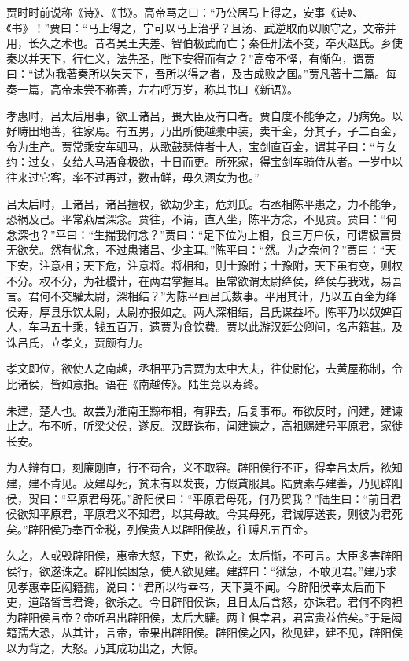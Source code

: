 \documentclass[]{article}
\begin{document}
贾时时前说称《诗》、《书》。高帝骂之曰：``乃公居马上得之，安事《诗》、《书》！''贾曰：``马上得之，宁可以马上治乎？且汤、武逆取而以顺守之，文帝并用，长久之术也。昔者吴王夫差、智伯极武而亡；秦任刑法不变，卒灭赵氏。乡使秦以并天下，行仁义，法先圣，陛下安得而有之？''高帝不怿，有惭色，谓贾曰：``试为我著秦所以失天下，吾所以得之者，及古成败之国。''贾凡著十二篇。每奏一篇，高帝未尝不称善，左右呼万岁，称其书曰《新语》。

孝惠时，吕太后用事，欲王诸吕，畏大臣及有口者。贾自度不能争之，乃病免。以好畴田地善，往家焉。有五男，乃出所使越橐中装，卖千金，分其子，子二百金，令为生产。贾常乘安车驷马，从歌鼓瑟侍者十人，宝剑直百金，谓其子曰：``与女约：过女，女给人马酒食极欲，十日而更。所死家，得宝剑车骑侍从者。一岁中以往来过它客，率不过再过，数击鲜，毋久溷女为也。''

吕太后时，王诸吕，诸吕擅权，欲劫少主，危刘氏。右丞相陈平患之，力不能争，恐祸及己。平常燕居深念。贾往，不请，直入坐，陈平方念，不见贾。贾曰：``何念深也？''平曰：``生揣我何念？''贾曰：``足下位为上相，食三万户侯，可谓极富贵无欲矣。然有忧念，不过患诸吕、少主耳。''陈平曰：``然。为之奈何？''贾曰：``天下安，注意相；天下危，注意将。将相和，则士豫附；士豫附，天下虽有变，则权不分。权不分，为社稷计，在两君掌握耳。臣常欲谓太尉绛侯，绛侯与我戏，易吾言。君何不交驩太尉，深相结？''为陈平画吕氏数事。平用其计，乃以五百金为绛侯寿，厚县乐饮太尉，太尉亦报如之。两人深相结，吕氏谋益坏。陈平乃以奴婢百人，车马五十乘，钱五百万，遗贾为食饮费。贾以此游汉廷公卿间，名声籍甚。及诛吕氏，立孝文，贾颇有力。

孝文即位，欲使人之南越，丞相平乃言贾为太中大夫，往使尉佗，去黄屋称制，令比诸侯，皆如意指。语在《南越传》。陆生竟以寿终。

朱建，楚人也。故尝为淮南王黥布相，有罪去，后复事布。布欲反时，问建，建谏止之。布不听，听梁父侯，遂反。汉既诛布，闻建谏之，高祖赐建号平原君，家徙长安。

为人辩有口，刻廉刚直，行不苟合，义不取容。辟阳侯行不正，得幸吕太后，欲知建，建不肯见。及建母死，贫未有以发丧，方假貣服具。陆贾素与建善，乃见辟阳侯，贺曰：``平原君母死。''辟阳侯曰：``平原君母死，何乃贺我？''陆生曰：``前日君侯欲知平原君，平原君义不知君，以其母故。今其母死，君诚厚送丧，则彼为君死矣。''辟阳侯乃奉百金税，列侯贵人以辟阳侯故，往赙凡五百金。

久之，人或毁辟阳侯，惠帝大怒，下吏，欲诛之。太后惭，不可言。大臣多害辟阳侯行，欲遂诛之。辟阳侯困急，使人欲见建。建辞曰：``狱急，不敢见君。''建乃求见孝惠幸臣闳籍孺，说曰：``君所以得幸帝，天下莫不闻。今辟阳侯幸太后而下吏，道路皆言君谗，欲杀之。今日辟阳侯诛，且日太后含怒，亦诛君。君何不肉袒为辟阳侯言帝？帝听君出辟阳侯，太后大驩。两主俱幸君，君富贵益倍矣。''于是闳籍孺大恐，从其计，言帝，帝果出辟阳侯。辟阳侯之囚，欲见建，建不见，辟阳侯以为背之，大怒。乃其成功出之，大惊。
\end{document}
